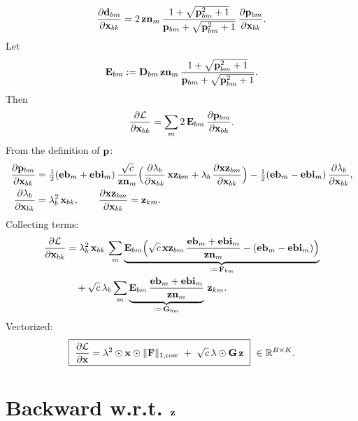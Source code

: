 \documentclass{article}
\begin{document}
\begin{align}
\ddfrac{\v{d}{bm}}{\v{x}{bk}}
= 2\,\v{zn}{m}\,\frac{1+\sqrt{\v{p}{bm}^2+1}}{\v{p}{bm}+\sqrt{\v{p}{bm}^2+1}}\,\ddfrac{\v{p}{bm}}{\v{x}{bk}}.
\end{align}
Let
\[
\v{E}{bm}:= \v{D}{bm}\,\v{zn}{m}\,\frac{1+\sqrt{\v{p}{bm}^2+1}}{\v{p}{bm}+\sqrt{\v{p}{bm}^2+1}}.
\]
Then
\begin{align}
\ddfrac{\mathcal{L}}{\v{x}{bk}}
= \sum_m 2\,\v{E}{bm}\,\ddfrac{\v{p}{bm}}{\v{x}{bk}}.
\end{align}
From the definition of $\v{p}$:
\begin{align}
\ddfrac{\v{p}{bm}}{\v{x}{bk}}
&= \tfrac12(\v{eb}{m}+\v{ebi}{m})\,\frac{\sqrt{c}}{\v{zn}{m}}
\Big(\ddfrac{\lambda_b}{\v{x}{bk}}\,\v{xz}{bm} + \lambda_b\,\ddfrac{\v{xz}{bm}}{\v{x}{bk}}\Big)
- \tfrac12(\v{eb}{m}-\v{ebi}{m})\,\ddfrac{\lambda_b}{\v{x}{bk}},
\\
\ddfrac{\lambda_b}{\v{x}{bk}} &= \lambda_b^2\,\v{x}{bk},\qquad
\ddfrac{\v{xz}{bm}}{\v{x}{bk}} = \v{z}{km}.
\end{align}
Collecting terms:
\begin{align}
\ddfrac{\mathcal{L}}{\v{x}{bk}}
&= \lambda_b^2\,\v{x}{bk}\,\sum_m \underbrace{\v{E}{bm}\Big(\sqrt{c}\,\v{xz}{bm}\,\frac{\v{eb}{m}+\v{ebi}{m}}{\v{zn}{m}} - (\v{eb}{m}-\v{ebi}{m})\Big)}_{:=\,\v{F}{bm}} \\
&\quad + \sqrt{c}\,\lambda_b \sum_m \underbrace{\v{E}{bm}\,\frac{\v{eb}{m}+\v{ebi}{m}}{\v{zn}{m}}}_{:=\,\v{G}{bm}}\,\v{z}{km}.
\end{align}
Vectorized:
\[
\boxed{\ \ddfrac{\mathcal{L}}{\v{x}} = \v{\lambda}^2 \had \v{x} \had \rownorm{\v{F}}\ +\ \sqrt{c}\,\v{\lambda}\had \v{G}\,\v{z}\ }\ \in\mathbb{R}^{B\times K}.
\]

\section{Backward w.r.t. $\v{z}$}
\end{document}
